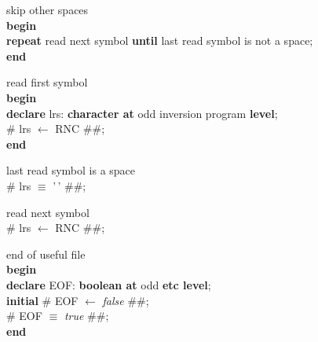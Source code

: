 \documentclass[openany,nobib]{tufte-book}
\newcommand{\kw}[1]{{\bf #1}}
\begin{document}
\bigskip

\noindent skip other spaces\\
\-\hspace{0.2cm} \kw{begin} \\
\-\hspace{0.4cm} \kw{repeat} read next symbol \kw{until} last read symbol is
not a space;\\
\-\hspace{0.2cm} \kw{end}

\bigskip

\noindent read first symbol\\
\-\hspace{0.2cm} \kw{begin} \\
\-\hspace{0.4cm} \kw{declare} lrs: \kw{character at} odd inversion program
\kw{level};\\
\-\hspace{0.4cm} \# lrs $\gets$ RNC \#\#;\\
\-\hspace{0.2cm} \kw{end}

\bigskip

\noindent last read symbol is a space\\
\-\hspace{0.2cm} \# lrs $\equiv$ '\textvisiblespace\,' \#\#;

\bigskip

\noindent read next symbol\\
\-\hspace{0.2cm} \# lrs $\gets$ RNC \#\#;

\bigskip

\noindent end of useful file\\
\-\hspace{0.2cm} \kw{begin} \\
\-\hspace{0.4cm} \kw{declare} EOF: \kw{boolean at} odd \kw{etc level};\\
\-\hspace{0.4cm} \kw{initial} \# EOF $\gets$ {\it false} \#\#;\\
\-\hspace{0.4cm} \# EOF $\equiv$ {\it true} \#\#;\\
\-\hspace{0.2cm} \kw{end}

\bigskip
\end{document}
